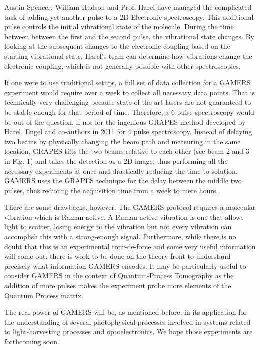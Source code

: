 Austin Spencer, William Hudson and Prof. Harel have managed the complicated task of adding yet another pulse to a 2D Electronic spectroscopy.  This additional pulse controls the initial vibrational state of the molecule.  During the time between between the first and the second pulse, the vibrational state changes. By looking at the subsequent changes to the electronic coupling based on the starting vibrational state, Harel's team can determine how vibrations change the electronic coupling, which is not generally possible with other spectroscopies.

If one were to use traditional setups, a full set of data collection for a GAMERS experiment would require over a week to collect all necessary data points.  That is technically very challenging because state of the art lasers are not guaranteed to be stable enough for that period of time. Therefore, a 6-pulse spectroscopy would be out of the question, if not for the ingenious GRAPES method developed by Harel, Engel and co-authors in 2011\cite{EngelGRAPES} for 4 pulse spectroscopy.  Instead of delaying two beams by physically changing the beam path and measuring in the same location, GRAPES tilts the two beams relative to each other (see beam 2 and 3 in Fig. 1) and takes the detection as a 2D image, thus performing all the necessary experiments at once and drastically reducing the time to solution.  GAMERS uses the GRAPES technique for the delay between the middle two pulses, thus reducing the acquisition time from a week to mere hours.

There are some drawbacks, however.  The GAMERS protocol requires a molecular vibration which is Raman-active.  A Raman active vibration is one that allows light to scatter, losing energy to the vibration but not every vibration can accomplish this with a strong-enough signal.  Furthermore, while there is no doubt that this is an experimental tour-de-force and some very useful information will come out, there is work to be done on the theory front to understand precisely what  information GAMERS encodes. It may be particularly useful to consider GAMERS in the context of Quantum-Process Tomography\cite{QPT1} as the addition of more pulses makes the experiment probe more elements of the Quantum Process matrix.

The real power of GAMERS will be, as mentioned before, in its application for the understanding of several photophysical processes involved in systems related to light-harvesting processes and optoelectronics. We hope those experiments are forthcoming soon.



